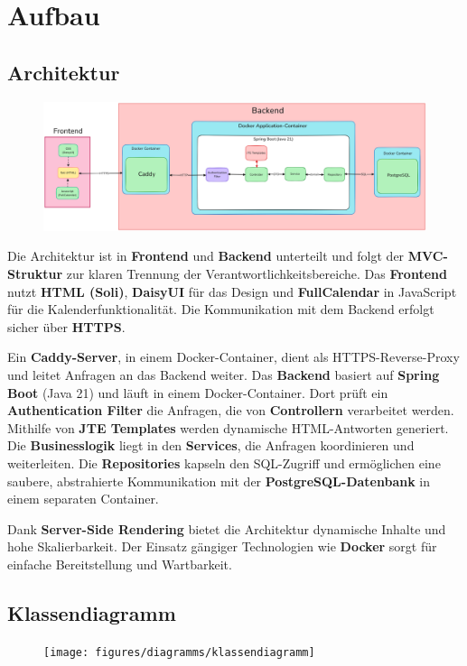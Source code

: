 
\chapter{Aufbau}
\label{ch:aufbau}

\section{Architektur}
\begin{figure}[ht]
    \centering
    \includegraphics[width=\textwidth]{figures/diagramms/Architekturmodell}
    \label{fig:architekturmodell}
\end{figure}
Die Architektur ist in \textbf{Frontend} und \textbf{Backend} unterteilt und folgt der \textbf{MVC-Struktur} zur klaren Trennung der Verantwortlichkeitsbereiche.
Das \textbf{Frontend} nutzt \textbf{HTML (Soli)}, \textbf{DaisyUI} für das Design und \textbf{FullCalendar} in JavaScript für die Kalenderfunktionalität.
Die Kommunikation mit dem Backend erfolgt sicher über \textbf{HTTPS}.

Ein \textbf{Caddy-Server}, in einem Docker-Container, dient als HTTPS-Reverse-Proxy und leitet Anfragen an das Backend weiter.
Das \textbf{Backend} basiert auf \textbf{Spring Boot} (Java 21) und läuft in einem Docker-Container. Dort prüft ein \textbf{Authentication Filter} die Anfragen,
die von \textbf{Controllern} verarbeitet werden. Mithilfe von \textbf{JTE Templates} werden dynamische HTML-Antworten generiert.
Die \textbf{Businesslogik} liegt in den \textbf{Services}, die Anfragen koordinieren und weiterleiten.
Die \textbf{Repositories} kapseln den SQL-Zugriff und ermöglichen eine saubere, abstrahierte Kommunikation mit der \textbf{PostgreSQL-Datenbank} in einem separaten Container.

Dank \textbf{Server-Side Rendering} bietet die Architektur dynamische Inhalte und hohe Skalierbarkeit. Der Einsatz gängiger Technologien wie \textbf{Docker} sorgt für einfache Bereitstellung und Wartbarkeit.
\clearpage

\section{Klassendiagramm}
\begin{figure}[ht]
    \centering
    \texttt{[image: figures/diagramms/klassendiagramm]}
    \label{fig:klassendiagramm}
\end{figure}
\clearpage